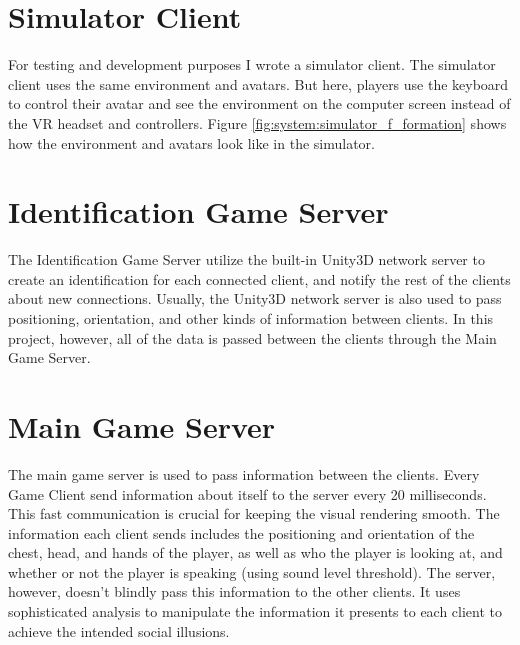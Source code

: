 \documentclass[]{simple-thesis}
\begin{document}
\section{Simulator Client}

For testing and development purposes I wrote a simulator client.
The simulator client uses the same environment and avatars.
But here, players use the keyboard to control their avatar and see the environment on the computer screen instead of the VR headset and controllers.
Figure \ref{fig:system:simulator_f_formation} shows how the environment and avatars look like in the simulator.

\section{Identification Game Server}

The Identification Game Server utilize the built-in Unity3D network server to create an identification for each connected client, and notify the rest of the clients about new connections.
Usually, the Unity3D network server is also used to pass positioning, orientation, and other kinds of information between clients.
In this project, however, all of the data is passed between the clients through the Main Game Server.

\section{Main Game Server}

The main game server is used to pass information between the clients.
Every Game Client send information about itself to the server every 20 milliseconds.
This fast communication is crucial for keeping the visual rendering smooth.
The information each client sends includes the positioning and orientation of the chest, head, and hands of the player, as well as who the player is looking at, and whether or not the player is speaking (using sound level threshold).
The server, however, doesn't blindly pass this information to the other clients.
It uses sophisticated analysis to manipulate the information it presents to each client to achieve the intended social illusions.
\end{document}
